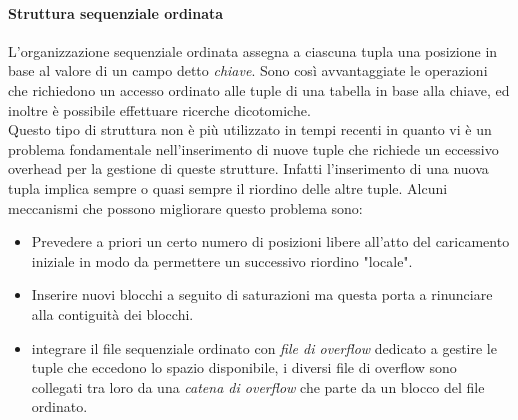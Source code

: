 \paragraph{Struttura sequenziale ordinata} L'organizzazione sequenziale ordinata assegna a ciascuna tupla una posizione in base al valore di un campo detto \emph{chiave}. Sono così avvantaggiate le operazioni che richiedono un accesso ordinato alle tuple di una tabella in base alla chiave, ed inoltre è possibile effettuare ricerche dicotomiche.\\
Questo tipo di struttura non è più utilizzato in tempi recenti in quanto vi è un problema fondamentale nell'inserimento di nuove tuple che richiede un eccessivo overhead per la gestione di queste strutture. Infatti l'inserimento di una nuova tupla implica sempre o quasi sempre il riordino delle altre tuple. Alcuni meccanismi che possono migliorare questo problema sono:
\begin{itemize}
  \item Prevedere a priori un certo numero di posizioni libere all'atto del caricamento iniziale in modo da permettere un successivo riordino "locale".
  \item Inserire nuovi blocchi a seguito di saturazioni ma questa porta a rinunciare alla contiguità dei blocchi.
  \item integrare il file sequenziale ordinato con \emph{file di overflow} dedicato a gestire le tuple che eccedono lo spazio disponibile, i diversi file di overflow sono collegati tra loro da una \emph{catena di overflow} che parte da un blocco del file ordinato.
\end{itemize}
